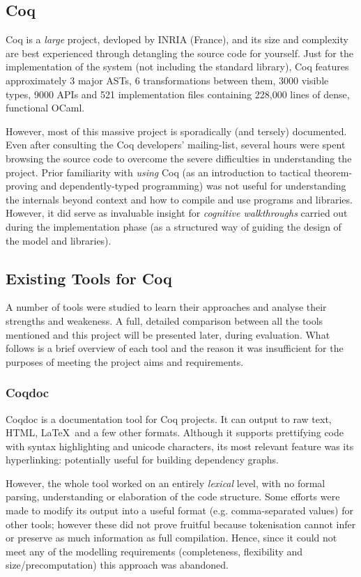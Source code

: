 \subsection{Coq}

Coq is a \emph{large} project, devloped by INRIA (France), and its size and
complexity are best experienced through detangling the source code for yourself.
Just for the implementation of the system (not including the standard library),
Coq features approximately 3 major ASTs, 6 transformations between them, 3000
visible types, 9000 APIs and 521 implementation files containing 228,000 lines
of dense, functional OCaml.

However, most of this massive project is sporadically (and tersely) documented.
Even after consulting the Coq developers' mailing-list, several hours were spent
browsing the source code to overcome the severe difficulties in understanding
the project. Prior familiarity with \emph{using} Coq (as an introduction
to tactical theorem-proving and dependently-typed programming) was not useful
for understanding the internals beyond context and how to compile and use
programs and libraries. However, it did serve as invaluable insight for
\emph{cognitive walkthroughs} carried out during the implementation phase
(as a structured way of guiding the design of the model and libraries).

\subsection{Existing Tools for Coq}
A number of tools were studied to learn their approaches and analyse their
strengths and weakeness. A full, detailed comparison between all the tools
mentioned and this project will be presented later, during evaluation.  What
follows is a brief overview of each tool and the reason it was insufficient for
the purposes of meeting the project aims and requirements.

\subsubsection{Coqdoc}
Coqdoc is a documentation tool for Coq projects. It can output to raw text,
HTML, \LaTeX~and a few other formats. Although it supports prettifying code with
syntax highlighting and unicode characters, its most relevant feature was its
hyperlinking: potentially useful for building dependency graphs.

However, the whole tool worked on an entirely \emph{lexical} level, with no
formal parsing, understanding or elaboration of the code structure. Some efforts
were made to modify its output into a useful format (e.g. comma-separated
values) for other tools; however these did not prove fruitful because
tokenisation cannot infer or preserve as much information as full compilation.
Hence, since it could not meet any of the modelling requirements (completeness,
flexibility and size/precomputation) this approach was abandoned.

